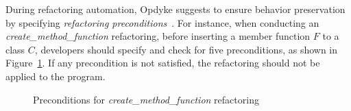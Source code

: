 During refactoring automation, Opdyke suggests to ensure behavior preservation by specifying \emph{refactoring preconditions}~\cite{Opdyke1992:ROF}. For instance, when conducting an \emph{create\_method\_function} refactoring, before inserting a member function $F$ to a class $C$, developers should specify and check for five preconditions, as shown in Figure~\ref{fig:preconditions}. If any precondition is not satisfied, the refactoring should not be applied to the program.

\begin{figure}[!htb]
\centering
{}
\caption{Preconditions for \emph{create\_method\_function} refactoring~\cite{Opdyke1992:ROF}}
\label{fig:preconditions}
\end{figure}


